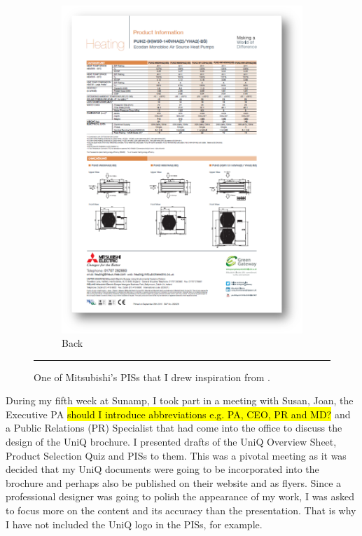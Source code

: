 \begin{figure}[htbp]
\begin{subfigure}{.485\textwidth}
          \includegraphics[width=\textwidth]{figures/Mitsubishi02.png}
          \caption{Back}
          \label{mitsubishi02}
        \end{subfigure}
    \rule{\textwidth}{0.5pt} %
    \caption{One of Mitsubishi's PISs that I drew inspiration from \citep{ref:Mitsubishi}.}
    \label{mitsubishi}
\end{figure}


During my fifth week at Sunamp, I took part in a meeting with Susan, Joan, the Executive PA \hl{should I introduce abbreviations e.g. PA, CEO, PR and MD?} and a Public Relations (PR) Specialist that had come into the office to discuss the design of the UniQ brochure.
I presented drafts of the UniQ Overview Sheet, Product Selection Quiz and PISs to them.
This was a pivotal meeting as it was decided that my UniQ documents were going to be incorporated into the brochure and perhaps also be published on their website and as flyers.
Since a professional designer was going to polish the appearance of my work, I was asked to focus more on the content and its accuracy than the presentation.
That is why I have not included the UniQ logo in the PISs, for example.

